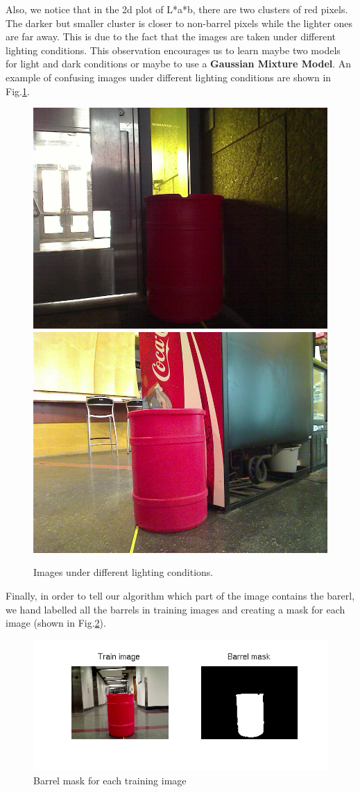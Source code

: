 \documentclass[twoside]{article}
\begin{document}
\begin{multicols}{2}
Also, we notice that in the 2d plot of L*a*b, there are two clusters of red pixels. The darker but smaller cluster is closer to non-barrel pixels while the lighter ones are far away. This is due to the fact that the images are taken under different lighting conditions. This observation encourages us to learn maybe two models for light and dark conditions or maybe to use a \textbf{Gaussian Mixture Model}. An example of confusing images under different lighting conditions are shown in Fig.\ref{fig:confusing}.

\begin{figure}[H]
  \centering
  \includegraphics[width=0.4\columnwidth]{barrel_dark.png}
  \;\;\;
  \includegraphics[width=0.4\columnwidth]{barrel_red.png}
  \caption{Images under different lighting conditions. \label{fig:confusing}}
\end{figure}

Finally, in order to tell our algorithm which part of the image contains the barerl, we hand labelled all the barrels in training images and creating a mask for each image (shown in Fig.\ref{fig:barrel_mask}).

\begin{figure}[H]
  \centering
  \includegraphics[width=\columnwidth]{barrel_mask.png}
    \caption{Barrel mask for each training image}
    \label{fig:barrel_mask}
\end{figure}


\end{multicols}
\end{document}
